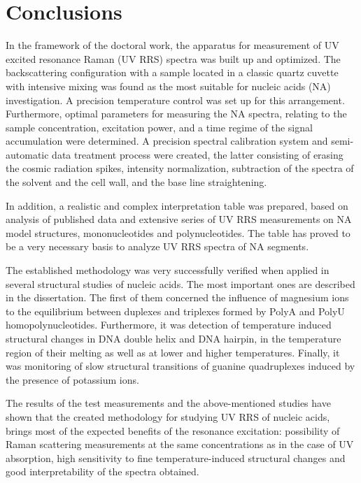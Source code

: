 \chapter*{Conclusions}

In the framework of the doctoral work, the apparatus for measurement of UV
excited resonance Raman (UV RRS) spectra was built up and optimized.
The backscattering configuration with a sample located in a classic quartz
cuvette with intensive mixing was found as the most suitable for nucleic acids
(NA) investigation.
A precision temperature control was set up for this arrangement.
Furthermore, optimal parameters for measuring the NA spectra, relating to the
sample concentration, excitation power, and a time regime of the signal
accumulation were determined.
A precision spectral calibration system and semi-automatic data treatment
process were created, the latter consisting of erasing the cosmic radiation
spikes, intensity normalization, subtraction of the spectra of the solvent and
the cell wall, and the base line straightening.

In addition, a realistic and complex interpretation table was prepared, based
on analysis of published data and extensive series of UV RRS measurements on NA
model structures, mononucleotides and polynucleotides.
The table has proved to be a very necessary basis to analyze UV RRS spectra of
NA segments.

The established methodology was very successfully verified when applied in
several structural studies of nucleic acids.
The most important ones are described in the dissertation.
The first of them concerned the influence of magnesium ions to the equilibrium
between duplexes and triplexes formed by PolyA and PolyU homopolynucleotides.
Furthermore, it was detection of temperature induced structural changes in DNA
double helix and DNA hairpin, in the temperature region of their melting as
well as at lower and higher temperatures.
Finally, it was monitoring of slow structural transitions of guanine
quadruplexes induced by the presence of potassium ions.

The results of the test measurements and the above-mentioned studies have shown
that the created methodology for studying UV RRS of nucleic acids, brings most
of the expected benefits of the resonance excitation: possibility of Raman
scattering measurements at the same concentrations as in the case of UV
absorption, high sensitivity to fine temperature-induced structural changes and
good interpretability of the spectra obtained.
